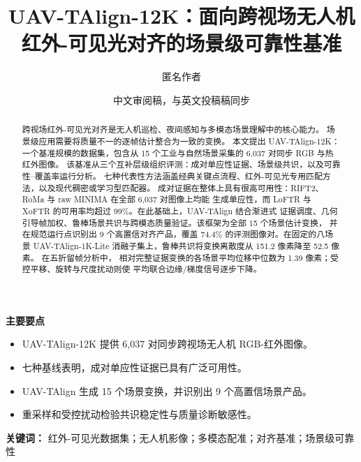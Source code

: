 \documentclass[UTF8,12pt,a4paper]{ctexart}
\title{UAV-TAlign-12K：面向跨视场无人机\\红外-可见光对齐的场景级可靠性基准}
\author{匿名作者}
\date{中文审阅稿，与英文投稿稿同步}
\begin{document}
\maketitle

\begin{abstract}
跨视场红外-可见光对齐是无人机巡检、夜间感知与多模态场景理解中的核心能力。
场景级应用需要将质量不一的逐帧估计整合为一致的变换。
本文提出 UAV-TAlign-12K：一个基准规模的数据集，包含从 15 个工业与自然场景采集的
6,037 对同步 RGB 与热红外图像。
该基准从三个互补层级组织评测：成对单应性证据、场景级共识，以及可靠性--覆盖率运行分析。
七种代表性方法涵盖经典关键点流程、红外-可见光专用匹配方法，以及现代稠密或学习型匹配器。
成对证据在整体上具有很高可用性：RIFT2、RoMa 与 raw MINIMA 在全部 6,037 对图像上均能
生成单应性，而 LoFTR 与 XoFTR 的可用率均超过 99\%。在此基础上，UAV-TAlign 结合渐进式
证据调度、几何引导帧加权、鲁棒场景共识与跨模态质量验证。该框架为全部 15 个场景估计变换，
并在规范运行点识别出 9 个高置信对齐产品，覆盖 74.4\% 的评测图像对。在固定的八场景
UAV-TAlign-1K-Lite 消融子集上，鲁棒共识将变换离散度从 151.2 像素降至 52.5 像素。
在五折留帧分析中，
相对完整证据变换的各场景平均位移中位数为 1.39 像素；受控平移、旋转与尺度扰动则使
平均联合边缘/梯度信号逐步下降。
\end{abstract}

\noindent\textbf{主要要点}
\begin{itemize}
\item UAV-TAlign-12K 提供 6,037 对同步跨视场无人机 RGB-红外图像。
\item 七种基线表明，成对单应性证据已具有广泛可用性。
\item UAV-TAlign 生成 15 个场景变换，并识别出 9 个高置信场景产品。
\item 重采样和受控扰动检验共识稳定性与质量诊断敏感性。
\end{itemize}

\noindent\textbf{关键词：} 红外-可见光数据集；无人机影像；多模态配准；对齐基准；场景级可靠性




\FloatBarrier

\FloatBarrier


\FloatBarrier



\appendix
{}


\FloatBarrier




\end{document}

